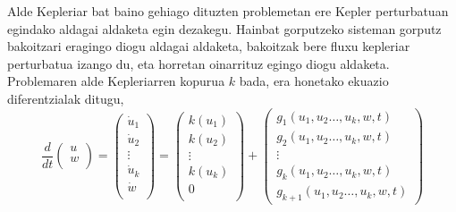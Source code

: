Alde Kepleriar bat baino gehiago dituzten problemetan ere Kepler perturbatuan egindako aldagai aldaketa egin dezakegu. Hainbat gorputzeko sisteman gorputz bakoitzari eragingo diogu aldagai aldaketa, bakoitzak bere fluxu kepleriar perturbatua izango du, eta horretan oinarrituz egingo diogu aldaketa. Problemaren alde Kepleriarren kopurua $k$ bada, era honetako ekuazio diferentzialak ditugu,
\begin{equation}
\label{eq: n-pertEDA}
\frac{d}{dt}\left(\begin{array}{c}
                u  \\
                w  \\
\end{array}\right)=
\left(\begin{array}{c}
                \dot{u}_1  \\
                \dot{u}_2  \\
                \vdots \\
                \dot{u}_k    \\
                \dot{w}      \\
\end{array}\right)=
\left(\begin{array}{c}
                k(u_1)  \\
                k(u_2)  \\
                \vdots \\
                k(u_k)  \\
                0      \\
\end{array}\right)+
\left(\begin{array}{c}
      g_1(u_1, u_2\dots, u_k,w,t) \\
      g_2(u_1, u_2\dots, u_k,w,t) \\
                \vdots \\
      g_k(u_1, u_2\dots, u_k,w,t)\\
      g_{k+1}(u_1, u_2\dots, u_k,w,t)
\end{array}\right)
\end{equation} 

